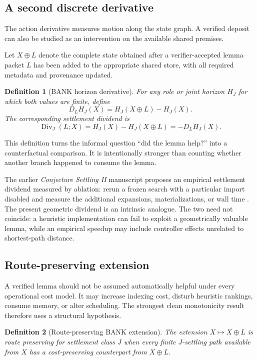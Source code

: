 \documentclass[11pt]{article}
\newtheorem{definition}{Definition}[section]
\theoremstyle{remark}
\begin{document}
\subsection{A second discrete derivative}

The action derivative measures motion along the state graph. A verified deposit can also be studied as an intervention on the available shared premises.

Let $X\oplus L$ denote the complete state obtained after a verifier-accepted lemma packet $L$ has been added to the appropriate shared store, with all required metadata and provenance updated.

\begin{definition}[BANK horizon derivative]
For any role or joint horizon $H_J$ for which both values are finite, define
\[
\boxed{D_LH_J(X)=H_J(X\oplus L)-H_J(X).}
\]
The corresponding settlement dividend is
\[
\operatorname{Div}_J(L;X)=H_J(X)-H_J(X\oplus L)=-D_LH_J(X).
\]
\end{definition}

This definition turns the informal question ``did the lemma help?'' into a counterfactual comparison. It is intentionally stronger than counting whether another branch happened to consume the lemma.

The earlier \emph{Conjecture Settling II} manuscript proposes an empirical settlement dividend measured by ablation: rerun a frozen search with a particular import disabled and measure the additional expansions, materializations, or wall time \cite{TennesonCSII}. The present geometric dividend is an intrinsic analogue. The two need not coincide: a heuristic implementation can fail to exploit a geometrically valuable lemma, while an empirical speedup may include controller effects unrelated to shortest-path distance.

\subsection{Route-preserving extension}

A verified lemma should not be assumed automatically helpful under every operational cost model. It may increase indexing cost, disturb heuristic rankings, consume memory, or alter scheduling. The strongest clean monotonicity result therefore uses a structural hypothesis.

\begin{definition}[Route-preserving BANK extension]
The extension $X\mapsto X\oplus L$ is route preserving for settlement class $J$ when every finite $J$-settling path available from $X$ has a cost-preserving counterpart from $X\oplus L$.
\end{definition}
\end{document}
